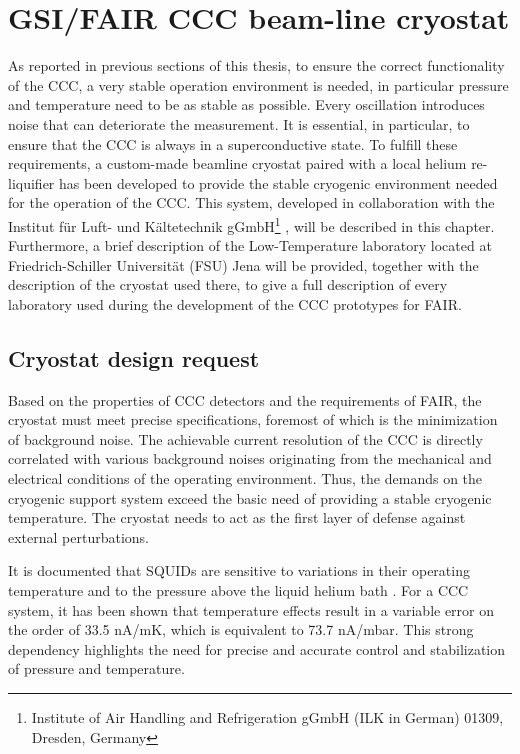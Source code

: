 \documentclass[12pt,a4paper]{report}
\begin{document}
       \chapter{GSI/FAIR CCC beam-line cryostat}
       As reported in previous sections of this thesis, to ensure the correct functionality of the CCC, a very stable operation environment is needed, in particular pressure and temperature need to be as stable as possible. Every oscillation introduces noise that can deteriorate the measurement. It is essential, in particular, to ensure that the CCC is always in a superconductive state. To fulfill these requirements, a custom-made beamline cryostat paired with a local helium re-liquifier has been developed to provide the stable cryogenic environment needed for the operation of the CCC. This system, developed in collaboration with the Institut für Luft- und Kältetechnik gGmbH\footnote{Institute of Air Handling and Refrigeration gGmbH (ILK in German) 01309, Dresden, Germany} \cite{DavidThesis} \cite{ILK}, will be described in this chapter. Furthermore, a brief description of the Low-Temperature laboratory located at Friedrich-Schiller Universität (FSU) Jena will be provided, together with the description of the cryostat used there, to give a full description of every laboratory used during the development of the CCC prototypes for FAIR.\\
       \section{Cryostat design request}
       	Based on the properties of CCC detectors and the requirements of FAIR, the cryostat must meet precise specifications, foremost of which is the minimization of background noise. The achievable current resolution of the CCC is directly correlated with various background noises originating from the mechanical and electrical conditions of the operating environment. Thus, the demands on the cryogenic support system exceed the basic need of providing a stable cryogenic temperature. The cryostat needs to act as the first layer of defense against external perturbations.
       	
       	It is documented that SQUIDs are sensitive to variations in their operating temperature and to the pressure above the liquid helium bath \cite{Squid_handbook_1} \cite{KurianTh}. For a CCC system, it has been shown that temperature effects result in a variable error on the order of 33.5 nA/mK, which is equivalent to 73.7 nA/mbar. This strong dependency highlights the need for precise and accurate control and stabilization of pressure and temperature.
       	
\end{document}
